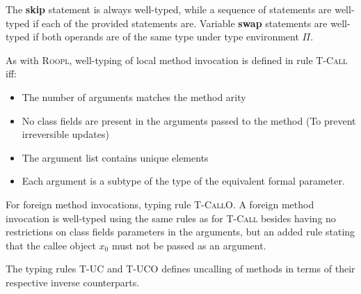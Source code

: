 The \textbf{skip} statement is always well-typed, while a sequence of statements are well-typed if each of the provided statements are. Variable \textbf{swap} statements are well-typed if both operands are of the same type under type environment $\Pi$.

As with \textsc{Roopl}, well-typing of local method invocation is defined in rule \textsc{T-Call} iff:
\begin{itemize}
    \item The number of arguments matches the method arity
    \item No class fields are present in the arguments passed to the method (To prevent irreversible updates)
    \item The argument list contains unique elements
    \item Each argument is a subtype of the type of the equivalent formal parameter. 
\end{itemize}

For foreign method invocations, typing rule \textsc{T-CallO}. A foreign method invocation is well-typed using the same rules as for \textsc{T-Call} besides having no restrictions on class fields parameters in the arguments, but an added rule stating that the callee object $x_0$ must not be passed as an argument.

The typing rules \textsc{T-UC} and \textsc{T-UCO} defines uncalling of methods in terms of their respective inverse counterparts.

